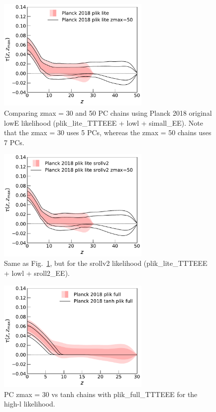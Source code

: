 \documentclass[prd,amsmath,amssymb,floatfix,superscriptaddress,nofootinbib]{revtex4-1}
\begin{document}
\begin{figure}
\includegraphics[width=0.65\textwidth]{results/direct_mcmc/pl18_plots_zmax30/plot_pub_tau_gtz_dz_0p1_pl18_pc_zmax30_pliklite_post_0930_and_pl18_pc_zmax50_pliklite_post.pdf}
\caption{Comparing zmax = 30 and 50 PC chains using Planck 2018 original lowE likelihood (plik\_lite\_TTTEEE + lowl + simall\_EE). Note that the zmax = 30 uses 5 PCs, whereas the zmax = 50 chains uses 7 PCs.
}
\label{fig:tau_gtz_zmax_30_vs_50_simall_EE}
\end{figure}


\begin{figure}
\includegraphics[width=0.65\textwidth]{results/direct_mcmc/pl18_plots_zmax30/plot_pub_tau_gtz_dz_0p1_pl18_pc_zmax30_pliklite_srollv2_0930_and_pl18_pc_zmax50_pliklite_srollv2.pdf}
\caption{Same as Fig.~\ref{fig:tau_gtz_zmax_30_vs_50_simall_EE}, but for the srollv2 likelihood (plik\_lite\_TTTEEE + lowl + sroll2\_EE).
}
\label{fig:}
\end{figure}

\begin{figure}
\includegraphics[width=0.65\textwidth]{results/direct_mcmc/pl18_plots_zmax30/plot_pub_tau_gtz_dz_0p1_pl18_pc_zmax30_plikfull_and_pl18_tanh_post_plikfull.pdf}
\caption{PC zmax = 30 vs tanh chains with plik\_full\_TTTEEE for the high-l likelihood.
}
\label{fig:}
\end{figure}
\end{document}
